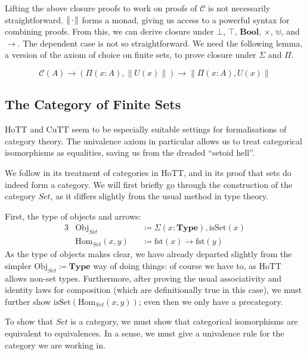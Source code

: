 Lifting the above closure proofs to work on proofs of \(\mathcal{C}\) is not
necessarily straightforward.
\(\lVert {\mkern 2mu\cdot\mkern 2mu} \rVert\) forms a monad, giving us access to a powerful syntax for
combining proofs.
From this, we can derive closure under \(\bot\), \(\top\), \(\mathbf{Bool}\),
\(\times\), \(\uplus\), and \(\rightarrow\).
The dependent case is not so straightforward.
We need the following lemma, a version of the axiom of choice on finite sets,
to prove closure under \(\Sigma\) and \(\Pi\).
\begin{romlemma}
  \begin{equation}
    \mathcal{C}(A) \rightarrow (\Pi(x : A) , \lVert U(x) \rVert) \rightarrow \lVert \Pi(x : A) , U(x) \rVert
  \end{equation}
\end{romlemma}
\subsection{The Category of Finite Sets}
HoTT and CuTT seem to be especially suitable settings for formalisations of
category theory.
The univalence axiom in particular allows us to treat categorical isomorphisms
as equalities, saving us from the dreaded ``setoid hell''.

We follow \cite[chapter 9]{hottbook} in its treatment of
categories in HoTT, and in its proof that sets do indeed form a category.
We will first briefly go through the construction of the category
\(\mathit{Set}\), as it differs slightly from the usual method in type theory.

First, the type of objects and arrows:
\begin{alignat}{3}
  &\text{Obj}_\mathit{Set}      &&\coloneqq \Sigma(x : \mathbf{Type}) , \text{isSet}(x) \\
  &\text{Hom}_\mathit{Set}(x , y) &&\coloneqq  \text{fst}(x) \rightarrow \text{fst}(y)
\end{alignat}
As the type of objects makes clear, we have already departed slightly from the
simpler \(\text{Obj}_\mathit{Set} \coloneqq \mathbf{Type}\) way of doing things:
of course we have to, as HoTT allows non-set types.
Furthermore, after proving the usual associativity and identity laws for
composition (which are definitionally true in this case), we must further show
\(\text{isSet}(\text{Hom}_\mathit{Set}(x,y))\); even then we only have a
precategory.

To show that \(\mathit{Set}\) is a category, we must show that categorical
isomorphisms are equivalent to equivalences.
In a sense, we must give a univalence rule for the category we are working in.

